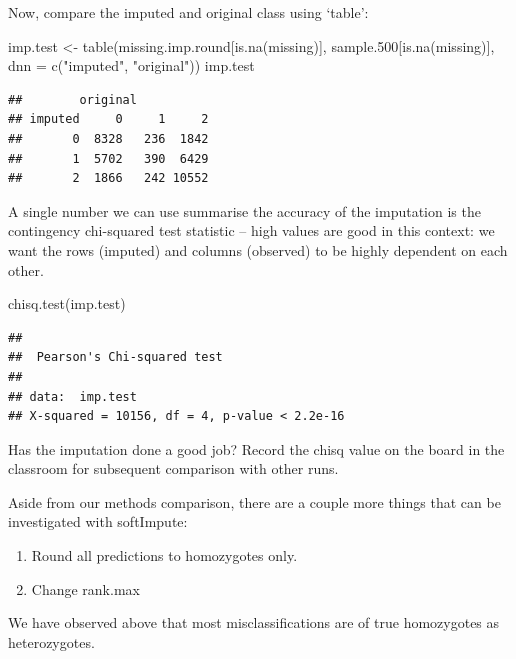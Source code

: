 \documentclass[
]{book}
\newenvironment{Shaded}{\begin{snugshade}}{\end{snugshade}}
\newcommand{\AttributeTok}[1]{\textcolor[rgb]{0.77,0.63,0.00}{#1}}
\newcommand{\FloatTok}[1]{\textcolor[rgb]{0.00,0.00,0.81}{#1}}
\newcommand{\FunctionTok}[1]{\textcolor[rgb]{0.00,0.00,0.00}{#1}}
\newcommand{\NormalTok}[1]{#1}
\newcommand{\OtherTok}[1]{\textcolor[rgb]{0.56,0.35,0.01}{#1}}
\newcommand{\StringTok}[1]{\textcolor[rgb]{0.31,0.60,0.02}{#1}}
\providecommand{\tightlist}{%
  \setlength{\itemsep}{0pt}\setlength{\parskip}{0pt}}
\begin{document}
Now, compare the imputed and original class using `table':

\begin{Shaded}
\begin{Highlighting}[]
\NormalTok{imp.test }\OtherTok{\textless{}{-}} \FunctionTok{table}\NormalTok{(missing.imp.round[}\FunctionTok{is.na}\NormalTok{(missing)], sample}\FloatTok{.500}\NormalTok{[}\FunctionTok{is.na}\NormalTok{(missing)], }
    \AttributeTok{dnn =} \FunctionTok{c}\NormalTok{(}\StringTok{"imputed"}\NormalTok{, }\StringTok{"original"}\NormalTok{))}
\NormalTok{imp.test}
\end{Highlighting}
\end{Shaded}

\begin{verbatim}
##        original
## imputed     0     1     2
##       0  8328   236  1842
##       1  5702   390  6429
##       2  1866   242 10552
\end{verbatim}

A single number we can use summarise the accuracy of the imputation is the contingency chi-squared test statistic -- high values are good in this context: we want the rows (imputed) and columns (observed) to be highly dependent on each other.

\begin{Shaded}
\begin{Highlighting}[]
\FunctionTok{chisq.test}\NormalTok{(imp.test)}
\end{Highlighting}
\end{Shaded}

\begin{verbatim}
## 
##  Pearson's Chi-squared test
## 
## data:  imp.test
## X-squared = 10156, df = 4, p-value < 2.2e-16
\end{verbatim}

Has the imputation done a good job? Record the chisq value on the board in the classroom for subsequent comparison with other runs.

Aside from our methods comparison, there are a couple more things that can be investigated with softImpute:

\begin{enumerate}
\def\labelenumi{\alph{enumi})}
\tightlist
\item
  Round all predictions to homozygotes only.
\item
  Change rank.max
\end{enumerate}

We have observed above that most misclassifications are of true homozygotes as heterozygotes.
\end{document}
